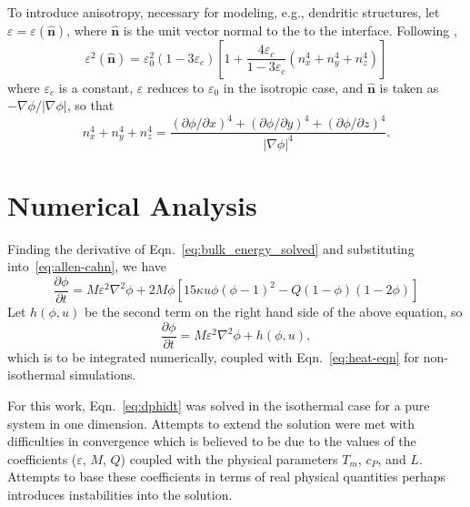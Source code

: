 \documentclass[12pt]{article}
\renewcommand\l{\mathopen{}\left}
\renewcommand\r{\right}
\newcommand\abs[1]{\l\vert #1 \r\vert}
\newcommand\grad[1]{\nabla #1}
\newcommand\lap[1]{\nabla^2 #1}
\let\epsilon\varepsilon
\renewcommand\vec[1]{\bm{#1}}
\newcommand\unit[1]{\hat{\vec{#1}}}
\begin{document}
To introduce anisotropy, necessary for modeling, e.g., dendritic
structures, let $\epsilon = \epsilon(\unit{n})$, where $\unit{n}$ is
the unit vector normal to the to the interface.
Following \cite{Bragard2002},
\begin{equation*}
  \epsilon^2\l( \unit n \r)
    = \epsilon_0^2
        \l( 1 - 3 \epsilon_c \r)
        \l[
          1  + \frac{4 \epsilon_c}{1 - 3 \epsilon_c}
          \l(
            n_x^4 + n_y^4 + n_z^4
          \r)
        \r]
\end{equation*}
where $\epsilon_c$ is a constant, $\epsilon$ reduces to $\epsilon_0$
in the isotropic case, and $\unit n$ is
taken as $- \grad \phi / \abs{ \grad \phi }$, so that
\begin{equation*}
  n_x^4 + n_y^4 + n_z^4 =
  \frac{
    \l( \partial \phi / \partial x \r)^4 +
    \l( \partial \phi / \partial y \r)^4 +
    \l( \partial \phi / \partial z \r)^4
  }{
    \abs{ \grad \phi }^4
  }.
\end{equation*}

\section{Numerical Analysis}
Finding the derivative of Eqn.~\eqref{eq:bulk_energy_solved} and
substituting into~\eqref{eq:allen-cahn}, we have
\begin{equation*}
  \frac {\partial \phi }{ \partial t } =
  M \epsilon^2 \lap{\phi} +
  2 M \phi \l[ 
    15 \kappa u \phi \l( \phi - 1 \r)^2 -
    Q \l( 1 - \phi \r) \l( 1 - 2 \phi \r)
  \r]
\end{equation*}
Let $h\l( \phi, u \r)$ be the second term on the right hand side of
the above equation, so
\begin{equation}
  \frac {\partial \phi }{ \partial t }
  = M \epsilon^2 \lap{\phi} + h\l( \phi, u \r),
  \label{eq:dphidt}
\end{equation}
which is to be integrated numerically, coupled with
Eqn.~\eqref{eq:heat-eqn} for non-isothermal simulations.

For this work, Eqn.~\eqref{eq:dphidt} was solved in the isothermal
case for a pure system in one dimension. Attempts to extend the
solution were met with difficulties in convergence which is believed
to be due to the values of the coefficients ($\epsilon$, $M$, $Q$)
coupled with the physical parameters $T_m$, $c_P$, and $L$. Attempts
to base these coefficients in terms of real physical quantities
perhaps introduces instabilities into the solution.
\end{document}

